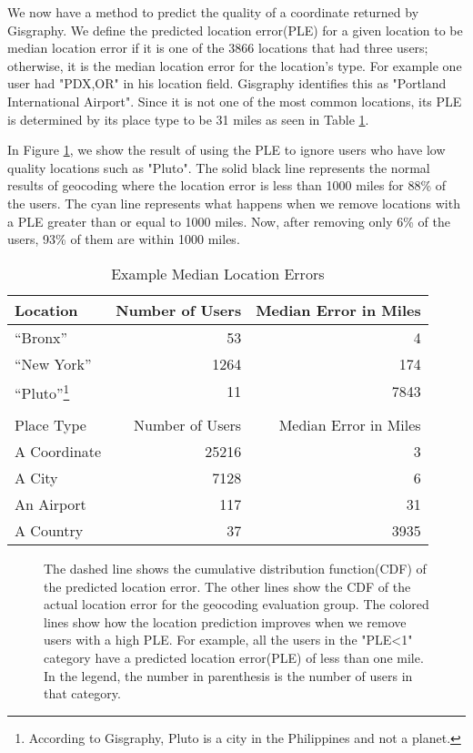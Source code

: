 \documentclass{sig-alternate}
\begin{document}
We now have a method to predict the quality of a coordinate returned by Gisgraphy.
We define the predicted location error(PLE) for a given location to be median location error if it is one of the 3866 locations that had three users; otherwise, it is the median location error for the location's type.
For example one user had "PDX,OR" in his location field. Gisgraphy identifies this as "Portland International Airport". Since it is not one of the most common locations, its PLE is determined by its place type to be 31 miles as seen in Table \ref{tab:MedianLocErr}.

In Figure \ref{fig:DiffGnpGps}, we show the result of using the PLE to ignore users who have low quality locations such as "Pluto".
The solid black line represents the normal results of geocoding where the location error is less than 1000 miles for 88\% of the users.
The cyan line represents what happens when we remove locations with a PLE greater than or equal to 1000 miles. Now, after removing only 6\% of the users, 93\% of them are within 1000 miles.

\begin{table}
\centering
\caption{Example Median Location Errors}
\begin{tabular}{l r r} 
Location&Number of Users&Median Error in Miles\\ \hline
``Bronx''&53&4\\
``New York''&1264&174\\
``Pluto''\footnote{According to Gisgraphy, Pluto is a city in the Philippines and not a planet.}&11&7843\\ \hline
\\
Place Type&Number of Users&Median Error in Miles\\ \hline
A Coordinate&25216&3\\
A City&7128&6\\
An Airport&117&31\\
A Country&37&3935\\
\hline\end{tabular}
\label{tab:MedianLocErr}
\end{table}

\begin{figure}
\centering
{}
\caption{
The dashed line shows the cumulative distribution function(CDF) of the predicted location error.
The other lines show the CDF of the actual location error for the geocoding evaluation group. The colored lines show how the location prediction improves when we remove users with a high PLE. For example, all the users in the "PLE<1" category have a predicted location error(PLE) of less than one mile.
In the legend, the number in parenthesis is the number of users in that category.
}
\label{fig:DiffGnpGps}
\end{figure}
\end{document}
